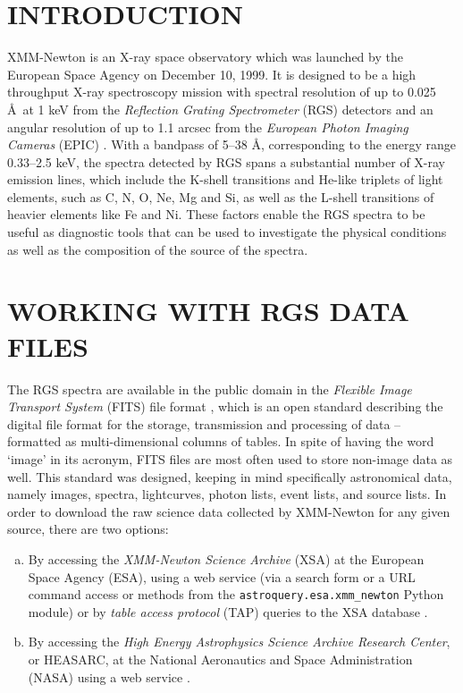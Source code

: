     \section{\MakeUppercase{Introduction}} \label{tool:intro}
    	XMM-Newton is an X-ray space observatory which was launched by the European Space Agency on December 10, 1999. It is designed to be a high throughput X-ray spectroscopy mission with spectral resolution of up to 0.025 \AA\ at 1 keV from the \textit{Reflection Grating Spectrometer} (RGS) detectors and an angular resolution of up to 1.1 arcsec from the \textit{European Photon Imaging Cameras} (EPIC) \cite{ehle2003xmm,jansen2001xmm}. With a bandpass of 5--38 \AA, corresponding to the energy range 0.33--2.5 keV, the spectra detected by RGS spans a substantial number of X-ray emission lines, which include the K-shell transitions and He-like triplets of light elements, such as C, N, O, Ne, Mg and Si, as well as the L-shell transitions of heavier elements like Fe and Ni. These factors enable the RGS spectra to be useful as diagnostic tools that can be used to investigate the physical conditions as well as the composition of the source of the spectra.
    
    \section{\MakeUppercase{Working with RGS Data Files}} \label{tool:rgs-files}
        The RGS spectra are available in the public domain in the \textit{Flexible Image Transport System} (FITS) file format \cite{chiappetti2018definition}, which is an open standard describing the digital file format for the storage, transmission and processing of data – formatted as multi-dimensional columns of tables. In spite of having the word `image' in its acronym, FITS files are most often used to store non-image data as well. This standard was designed, keeping in mind specifically astronomical data, namely images, spectra, lightcurves, photon lists, event lists, and source lists. In order to download the raw science data collected by XMM-Newton for any given source, there are two options:
        \begin{enumerate}[a)]
            \item By accessing the \textit{XMM-Newton Science Archive} (XSA) at the European Space Agency (ESA), using a web service (via a search form or a URL command access or methods from the \texttt{astroquery.esa.xmm\_newton} Python module) or by  \textit{table access protocol} (TAP) queries to the XSA database \cite{arviset2002xmm}.
            
            \item By accessing the \textit{High Energy Astrophysics Science Archive Research Center}, or HEASARC, at the National Aeronautics and Space Administration (NASA) using a web service \cite{barrett1993heasarc}.
        \end{enumerate}
        
